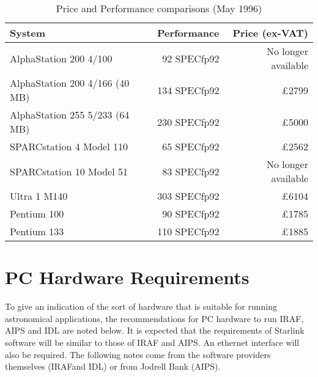 \documentclass[twoside,11pt]{article}
\newcommand{\htmladdnormallink}[2]{#1}
\newcommand{\AIPS}{\small{AIPS}\normalsize}
\newcommand{\IDL}{\small{IDL}\normalsize}
\newcommand{\IDLref}{\htmladdnormallink{\IDL}{http://rsinc.com/idl/}}
\newcommand{\IRAF}{\small{IRAF}\normalsize}
\newcommand{\IRAFref}{\htmladdnormallink{\IRAF}{http://iraf.noao.edu/iraf-homepage.html}}
\begin{document}
\begin{table}[h]
\begin{center}
\begin {tabular}{|l|r|r|}
\hline
{\bf System}                   & {\bf Performance}  &   {\bf Price (ex-VAT)} \\
\hline
AlphaStation 200 4/100         &    92 SPECfp92 &   No longer available  \\
AlphaStation 200 4/166 (40 MB) &   134 SPECfp92 &   \pounds 2799  \\
AlphaStation 255 5/233 (64 MB) &   230 SPECfp92 &   \pounds 5000  \\
\hline
SPARCstation 4 Model 110       &    65 SPECfp92 &   \pounds 2562  \\
SPARCstation 10 Model 51       &    83 SPECfp92 &   No longer available  \\
Ultra 1 M140                   &   303 SPECfp92 &   \pounds 6104  \\
\hline 
Pentium 100                    &    90 SPECfp92 &   \pounds 1785  \\
Pentium 133                    &   110 SPECfp92 &   \pounds 1885  \\
\hline 
\end{tabular}
\caption{Price and Performance comparisons (May 1996)}
\end{center}
\end {table}


\section{PC Hardware Requirements}

To give an indication of the sort of hardware that is 
suitable for running astronomical applications, 
the recommendations for PC hardware to run IRAF, AIPS and IDL
are noted below. It is expected that the requirements of Starlink
software will be similar to those of IRAF and AIPS.  An ethernet
interface will also be required. The following notes come from the
software providers themselves (\IRAFref and \IDLref) or from 
Jodrell Bank (\AIPS).
\end{document}
